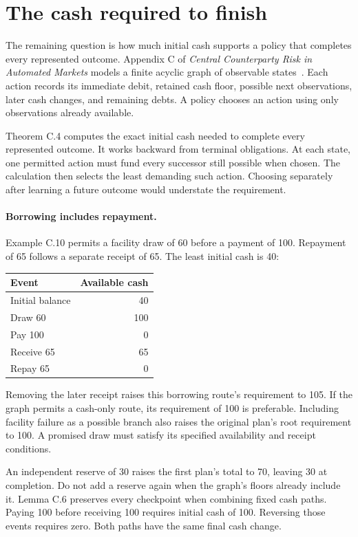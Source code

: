 \documentclass{momentum}
\begin{document}
\section{The cash required to finish}

The remaining question is how much initial cash supports a policy that completes every represented outcome. Appendix C of \emph{Central Counterparty Risk in Automated Markets} models a finite acyclic graph of observable states~\cite{ccp}. Each action records its immediate debit, retained cash floor, possible next observations, later cash changes, and remaining debts. A policy chooses an action using only observations already available.

Theorem C.4 computes the exact initial cash needed to complete every represented outcome. It works backward from terminal obligations. At each state, one permitted action must fund every successor still possible when chosen. The calculation then selects the least demanding such action. Choosing separately after learning a future outcome would understate the requirement.

\paragraph{Borrowing includes repayment.}
Example C.10 permits a facility draw of 60 before a payment of 100. Repayment of 65 follows a separate receipt of 65. The least initial cash is 40:
\begin{center}
\begin{tabular}{lr}
\toprule
Event & Available cash\\
\midrule
Initial balance & 40\\
Draw 60 & 100\\
Pay 100 & 0\\
Receive 65 & 65\\
Repay 65 & 0\\
\bottomrule
\end{tabular}
\end{center}
Removing the later receipt raises this borrowing route's requirement to 105. If the graph permits a cash-only route, its requirement of 100 is preferable. Including facility failure as a possible branch also raises the original plan's root requirement to 100. A promised draw must satisfy its specified availability and receipt conditions.

An independent reserve of 30 raises the first plan's total to 70, leaving 30 at completion. Do not add a reserve again when the graph's floors already include it. Lemma C.6 preserves every checkpoint when combining fixed cash paths. Paying 100 before receiving 100 requires initial cash of 100. Reversing those events requires zero. Both paths have the same final cash change.
\end{document}
